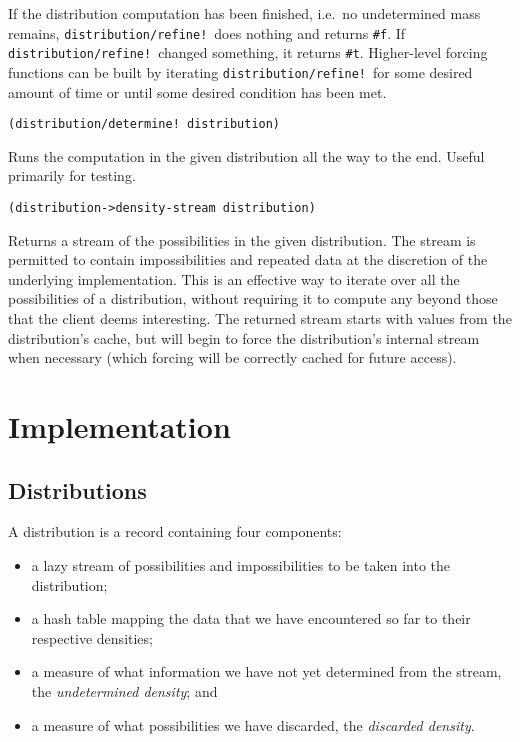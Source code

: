 \documentclass[12pt]{article}
\newcommand{\code}[1]{\texttt{#1}}
\newcommand{\concept}[1]{\textit{#1}}
\begin{document}
If the distribution computation has been finished, i.e.\ no
undetermined mass remains, \code{distribution/refine!}\ does nothing
and returns \code{\#f}.  If \code{distribution/refine!}\ changed
something, it returns \code{\#t}.  Higher-level forcing functions can
be built by iterating \code{distribution/refine!}\ for some desired
amount of time or until some desired condition has been met.

\begin{verbatim}
(distribution/determine! distribution)
\end{verbatim}

Runs the computation in the given distribution all the way to the end.
Useful primarily for testing.

\begin{verbatim}
(distribution->density-stream distribution)
\end{verbatim}

Returns a stream of the possibilities in the given distribution.  The
stream is permitted to contain impossibilities and repeated data at
the discretion of the underlying implementation.  This is an effective
way to iterate over all the possibilities of a distribution, without
requiring it to compute any beyond those that the client deems
interesting.  The returned stream starts with values from the
distribution's cache, but will begin to force the distribution's
internal stream when necessary (which forcing will be correctly cached
for future access).

\section{Implementation}
\label{implementation}

\subsection{Distributions}

A distribution is a record containing four components:

\begin{itemize}

 \item a lazy stream of possibilities and impossibilities to be taken
   into the distribution;

 \item a hash table mapping the data that we have encountered so far
   to their respective densities;

 \item a measure of what information we have not yet determined from
   the stream, the \concept{undetermined density}; and

 \item a measure of what possibilities we have discarded, the
   \concept{discarded density}.

\end{itemize}
\end{document}
